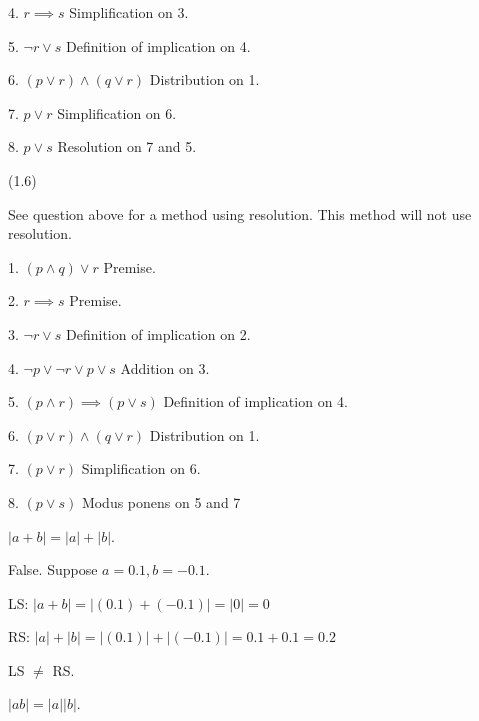 \documentclass{exam}
\begin{document}
\begin{questions}
\begin{center}
4. \( r \implies s \) Simplification on 3.

5. \( \neg r \lor s \) Definition of implication on 4.

6. \( (p \lor r) \land (q \lor r) \) Distribution on 1.

7. \( p \lor r \) Simplification on 6.

8. \( p \lor s \) Resolution on 7 and 5.

\end{center}

 (1.6)

\begin{center}
See question above for a method using resolution. This method will not use resolution.

1. \( (p \land q) \lor r\) Premise.

2. \( r \implies s\) Premise.

3. \( \neg r \lor s \) Definition of implication on 2.

4. \( \neg p \lor \neg r \lor p \lor s \) Addition on 3.

5. \( (p \land r) \implies (p \lor s) \) Definition of implication on 4.

6. \( (p \lor r) \land (q \lor r) \) Distribution on 1.

7. \( (p \lor r) \) Simplification on 6.

8. \( (p \lor s) \) Modus ponens on 5 and 7

\end{center}

\begin{subparts}
\subpart \( |a + b| = |a| + |b| \).

\begin{center}

False. Suppose \(a = 0.1, b = -0.1\).

LS: \( |a+b| = |(0.1)+(-0.1)| = |0| = 0 \)

RS: \( |a|+|b| = |(0.1)|+|(-0.1)| = 0.1 + 0.1 = 0.2 \)

LS \(\neq\) RS.

\end{center}

\newpage

\subpart \( |ab| = |a||b| \).

\begin{center}


\end{center}
\end{subparts}
\end{questions}
\end{document}
